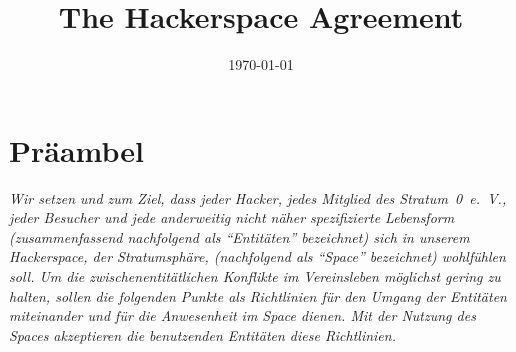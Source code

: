 \documentclass[12pt,a4paper]{scrartcl}
\title{The Hackerspace Agreement}
\date{\today}
\begin{document}
\maketitle

\section*{Präambel}
{\itshape
Wir setzen und zum Ziel, dass jeder Hacker, jedes Mitglied des Stratum~0~e.~V.,
jeder Besucher und jede anderweitig nicht näher spezifizierte Lebensform
(zusammenfassend nachfolgend als "`Entitäten"' bezeichnet) sich in unserem
Hackerspace, der \emph{Stratumsphäre}, (nachfolgend als "`Space"' bezeichnet)
wohlfühlen soll. Um die zwischenentitätlichen Konflikte im Vereinsleben
möglichst gering zu halten, sollen die folgenden Punkte als Richtlinien
für den Umgang der Entitäten miteinander und für die Anwesenheit im Space
dienen. Mit der Nutzung des Spaces akzeptieren die benutzenden Entitäten diese
Richtlinien.
}
\end{document}
